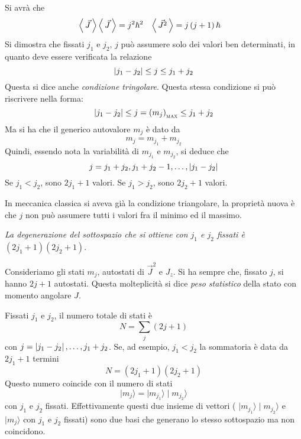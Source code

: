 Si avrà che
\begin{align}
\left\langle\, \vec{J} \,\right\rangle\left\langle\, \vec{J} \,\right\rangle &= j^{2} \hbar ^{2} & \left\langle\, \vec{J^{2}} \,\right\rangle &= j\left(j+1\right)\hbar 
\end{align}
Si dimostra che fissati $j_{1}$ e $j_{2}$, $j$ può assumere solo dei valori ben
determinati, in quanto deve essere verificata la relazione
\begin{equation}
\left| j_{1} - j_{2} \right| \leq j \leq j_{1} + j_{2} 
\end{equation}
Questa si dice anche \textit{condizione tringolare}. Questa stessa condizione si
può riscrivere nella forma:
\begin{equation}
\left| j_{1} - j_{2} \right| \leq j = \left(m_{j}\right)_\text{\scshape max} \leq j_{1} + j_{2}
\end{equation}
Ma si ha che il generico autovalore $m_{j}$ è dato da
\begin{equation}
m_{j} = m_{j_{1}} + m_{j_{2}}
\end{equation}
Quindi, essendo nota la variabilità di $m_{j_{1}}$ e $m_{j_{2}}$, si deduce che
\begin{equation}
j = j_{1} + j_{2}, j_{1} + j_{2}-1, \dots , \left| j_{1} - j_{2} \right|
\end{equation}
Se $j_{1}<j_{2}$, sono $2j_{1} + 1$ valori. Se $j_{1}>j_{2}$, sono $2j_{2} + 1$
valori.

In meccanica classica si aveva già la condizione triangolare, la proprietà nuova
è che $j$ non può assumere tutti i valori fra il minimo ed il massimo. 

\textit{La degenerazione del sottospazio che si ottiene con $j_{1}$ e $j_{2}$
fissati è $\left(2j_{1} + 1\right)\left(2j_{2}+1\right)$}.

Consideriamo gli stati $m_{j}$, autostati di $\vec{J}^{2}$ e $J_{z}$. Si ha
sempre che, fissato $j$, si hanno $2j +1$ autostati. Questa molteplicità si dice
\textit{peso statistico} della stato con momento angolare $J$.

Fissati $j_{1}$ e $j_{2}$, il numero totale di stati è 
\begin{equation}
N = \sum _{j} \left(2j +1\right)
\end{equation}
con $j=\left| j_{1} - j_{2} \right|, \dots , j_{1} +j_{2}$.
Se, ad esempio, $j_{1}<j_{2}$ la sommatoria è data da $2j_{1} + 1$ termini
\begin{equation}
N = \left(2j_{1} + 1\right)\left(2j_{2}+1\right)
\end{equation}
Questo numero coincide con il numero di stati 
\begin{equation}
\mid m_{j}\rangle = \mid m_{j_{1}}\rangle \mid m_{j_{2}}\rangle
\end{equation}
con $j_{1}$ e $j_{2}$ fissati. Effettivamente questi due insieme di vettori (
$\mid m_{j_{1}}\rangle \mid m_{j_{2}}\rangle$ e $\mid m_{j}\rangle$ con $j_{1}$
e $j_{2}$ fissati) sono due basi che generano lo stesso sottospazio ma non coincidono.

